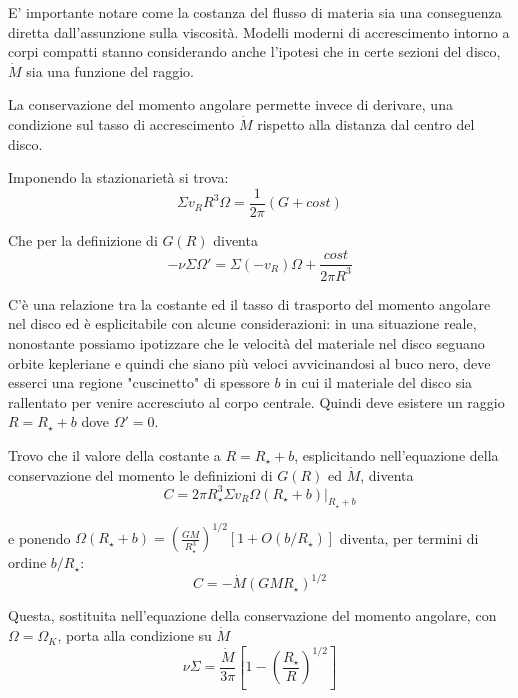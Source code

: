 \documentclass[a4paperbi]{article}
\begin{document}
	E' importante notare come la costanza del flusso di materia sia una conseguenza diretta dall'assunzione sulla viscosità. Modelli moderni di accrescimento intorno a corpi compatti stanno considerando anche l'ipotesi che in certe sezioni del disco, $\dot{M}$ sia una funzione del raggio.
	
	La conservazione del momento angolare permette invece di derivare, una condizione sul tasso di accrescimento $\dot{M}$ rispetto alla distanza dal centro del disco.
	
	Imponendo la stazionarietà si trova:
	\begin{equation}
		\Sigma v_RR^3\Omega=\frac{1}{2\pi}(G+cost)
	\end{equation}
	
	Che per la definizione di $G(R)$ diventa
	\begin{equation}
		-\nu\Sigma\Omega'=\Sigma(-v_R)\Omega+\frac{cost}{2\pi R^3}
	\end{equation}
	
	C'è una relazione tra la costante ed il tasso di trasporto del momento angolare nel disco ed è esplicitabile con alcune considerazioni: in una situazione reale, nonostante possiamo ipotizzare che le velocità del materiale nel disco seguano orbite kepleriane e quindi che siano più veloci avvicinandosi al buco nero, deve esserci una regione "cuscinetto" di spessore $b$ in cui il materiale del disco sia rallentato per venire accresciuto al corpo centrale. Quindi deve esistere un raggio $R=R_{\star}+b$ dove $\Omega'=0$.

	Trovo che il valore della costante a $R=R_{\star}+b$, esplicitando nell'equazione della conservazione del momento le definizioni di $G(R)$ ed $\dot{M}$, diventa
	\begin{equation*}
		C=2\pi R_{\star}^3\Sigma v_R\Omega(R_{\star}+b)\vert_{R_{\star}+b}
	\end{equation*}
	
	e ponendo $\Omega(R_{\star}+b)=\left(\frac{GM}{R_{\star}^3}\right)^{1/2}[1+O(b/R_{\star})]$ diventa, per termini di ordine $b/R_{\star}$:
	\begin{equation}
		C=-\dot{M}(GMR_{\star})^{1/2}
	\end{equation}	

	Questa, sostituita nell'equazione della conservazione del momento angolare, con $\Omega=\Omega_K$, porta alla condizione su $\dot{M}$
	\begin{equation}
		\nu\Sigma=\frac{\dot{M}}{3\pi}\left[1-\left(\frac{R_{\star}}{R}\right)^{1/2}\right]
	\end{equation}
	
\end{document}
